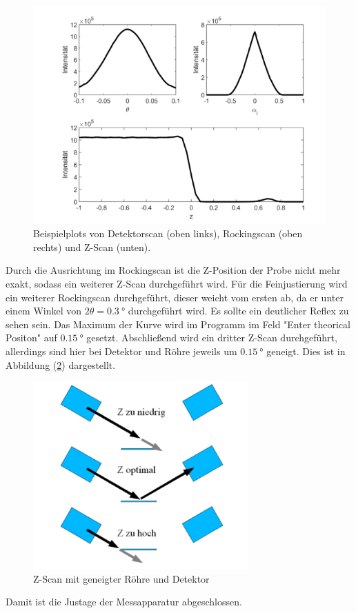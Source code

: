 \begin{figure}[h!]
  \centering
  \includegraphics[scale=0.7]{fig/beispiel.png}
  \caption{Beispielplots von Detektorscan (oben links), Rockingscan (oben rechts) und Z-Scan (unten). \cite[6]{Anleitung4}}
  \label{fig:beispiele}
\end{figure}
\FloatBarrier
\noindent Durch die Ausrichtung im Rockingscan ist die Z-Position der Probe nicht mehr exakt, sodass ein weiterer Z-Scan durchgeführt wird. Für die Feinjustierung wird ein weiterer Rockingscan durchgeführt, dieser weicht vom ersten ab, da er unter einem Winkel von $2\theta=\SI{0.3}{\degree}$ durchgeführt wird. Es sollte ein deutlicher Reflex zu sehen sein.  Das Maximum der Kurve wird im Programm im Feld "Enter theorical Positon" auf $\SI{0.15}{\degree}$ gesetzt. Abschließend wird ein dritter Z-Scan durchgeführt, allerdings sind hier bei Detektor und Röhre jeweils um $\SI{0.15}{\degree}$ geneigt. Dies ist in Abbildung (\ref{fig:zscan015}) dargestellt.
\begin{figure}[h!]
  \centering
  \includegraphics[scale=0.7]{fig/zscan015.png}
  \caption{Z-Scan mit geneigter Röhre und Detektor \cite[7]{Anleitung4}}
  \label{fig:zscan015}
\end{figure}
\FloatBarrier
\noindent Damit ist die Justage der Messapparatur abgeschlossen.
